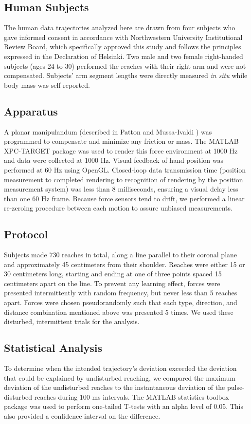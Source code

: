 \subsection*{Human Subjects}
The human data trajectories analyzed here are drawn from four subjects who gave informed consent in accordance with Northwestern University Institutional Review Board, which specifically approved this study and follows the principles expressed in the Declaration of Helsinki. Two male and two female right-handed subjects (ages 24 to 30) performed the reaches with their right arm and were not compensated. Subjects' arm segment lengths were directly measured \textit{in situ} while body mass was self-reported. 

\subsection*{Apparatus}
A planar manipulandum (described in Patton and Mussa-Ivaldi \cite{patton2004robot}) was programmed to compensate and minimize any friction or mass. The MATLAB XPC-TARGET package \cite{MATLAB:2008} was used to render this force environment at 1000 Hz and data were collected at 1000 Hz.  Visual feedback of hand position was performed at 60 Hz using OpenGL. Closed-loop data transmission time (position measurement to completed rendering to recognition of rendering by the position measurement system) was less than 8 milliseconds, ensuring a visual delay less than one 60 Hz frame. Because force sensors tend to drift, we performed a linear re-zeroing procedure between each motion to assure unbiased measurements. 

\subsection*{Protocol}
Subjects made 730 reaches in total, along a line parallel to their coronal plane and approximately 45 centimeters from their shoulder. Reaches were either 15 or 30 centimeters long, starting and ending at one of three points spaced 15 centimeters apart on the line. To prevent any learning effect, forces were presented intermittently with random frequency, but never less than 5 reaches apart. Forces were chosen pseudorandomly such that each type, direction, and distance combination mentioned above was presented 5 times. We used these disturbed, intermittent trials for the analysis. 

\subsection*{Statistical Analysis}
To determine when the intended trajectory's deviation exceeded the deviation that could be explained by undisturbed reaching, we compared the maximum deviation of the undisturbed reaches to the instantaneous deviation of the pulse-disturbed reaches during 100 ms intervals. The MATLAB statistics toolbox package \cite{MATLAB:2008} was used to perform one-tailed T-tests with an alpha level of 0.05. This also provided a confidence interval on the difference.


